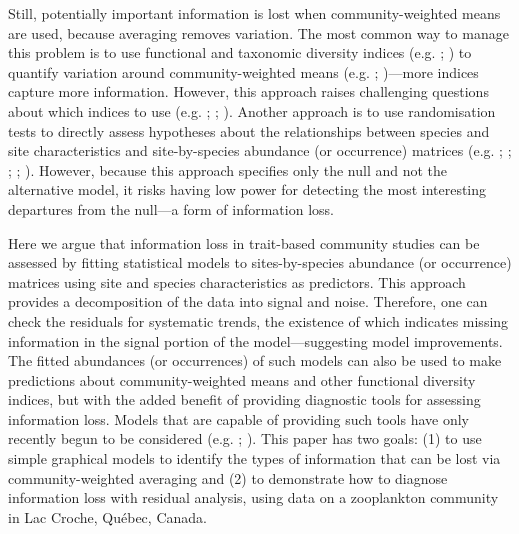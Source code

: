 \documentclass[12pt]{ecology}
\begin{document}
Still, potentially important information is lost when community-weighted means are used, because averaging removes variation.  The most common way to manage this problem is to use functional and taxonomic diversity indices (e.g. ; ) to quantify variation around community-weighted means (e.g. ; )---more indices capture more information.  However, this approach raises challenging questions about which indices to use (e.g. ; ; ).  Another approach is to use randomisation tests to directly assess hypotheses about the relationships between species and site characteristics and site-by-species abundance (or occurrence) matrices (e.g. ; ; ; ; ).  However, because this approach specifies only the null and not the alternative model, it risks having low power for detecting the most interesting departures from the null---a form of information loss.

Here we argue that information loss in trait-based community studies can be assessed by fitting statistical models to sites-by-species abundance (or occurrence) matrices using site and species characteristics as predictors.  This approach provides a decomposition of the data into signal and noise.  Therefore, one can check the residuals for systematic trends, the existence of which indicates missing information in the signal portion of the model---suggesting model improvements.  The fitted abundances (or occurrences) of such models can also be used to make predictions about community-weighted means and other functional diversity indices, but with the added benefit of providing diagnostic tools for assessing information loss.  Models that are capable of providing such tools have only recently begun to be considered (e.g. ; ).  This paper has two goals:  (1) to use simple graphical models to identify the types of information that can be lost via community-weighted averaging and (2) to demonstrate how to diagnose information loss with residual analysis, using data on a zooplankton community in Lac Croche, Qu\'{e}bec, Canada.
\end{document}
